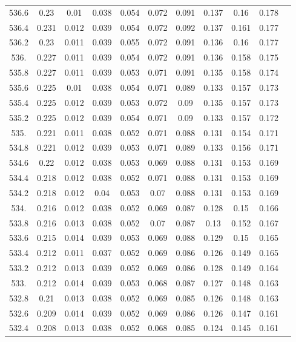 \documentclass[12pt]{ctexart}
\numberwithin{equation}{section}
\begin{document}
\begin{longtable}{ccccccccccc}
536.6	&	0.23	&	0.01	&	0.038	&	0.054	&	0.072	&	0.091	&	0.137	&	0.16	&	0.178	\\
536.4	&	0.231	&	0.012	&	0.039	&	0.054	&	0.072	&	0.092	&	0.137	&	0.161	&	0.177	\\
536.2	&	0.23	&	0.011	&	0.039	&	0.055	&	0.072	&	0.091	&	0.136	&	0.16	&	0.177	\\
536.	&	0.227	&	0.011	&	0.039	&	0.054	&	0.072	&	0.091	&	0.136	&	0.158	&	0.175	\\
535.8	&	0.227	&	0.011	&	0.039	&	0.053	&	0.071	&	0.091	&	0.135	&	0.158	&	0.174	\\
535.6	&	0.225	&	0.01	&	0.038	&	0.054	&	0.071	&	0.089	&	0.133	&	0.157	&	0.173	\\
535.4	&	0.225	&	0.012	&	0.039	&	0.053	&	0.072	&	0.09	&	0.135	&	0.157	&	0.173	\\
535.2	&	0.225	&	0.012	&	0.039	&	0.054	&	0.071	&	0.09	&	0.133	&	0.157	&	0.172	\\
535.	&	0.221	&	0.011	&	0.038	&	0.052	&	0.071	&	0.088	&	0.131	&	0.154	&	0.171	\\
534.8	&	0.221	&	0.012	&	0.039	&	0.053	&	0.071	&	0.089	&	0.133	&	0.156	&	0.171	\\
534.6	&	0.22	&	0.012	&	0.038	&	0.053	&	0.069	&	0.088	&	0.131	&	0.153	&	0.169	\\
534.4	&	0.218	&	0.012	&	0.038	&	0.052	&	0.071	&	0.088	&	0.131	&	0.153	&	0.169	\\
534.2	&	0.218	&	0.012	&	0.04	&	0.053	&	0.07	&	0.088	&	0.131	&	0.153	&	0.169	\\
534.	&	0.216	&	0.012	&	0.038	&	0.052	&	0.069	&	0.087	&	0.128	&	0.15	&	0.166	\\
533.8	&	0.216	&	0.013	&	0.038	&	0.052	&	0.07	&	0.087	&	0.13	&	0.152	&	0.167	\\
533.6	&	0.215	&	0.014	&	0.039	&	0.053	&	0.069	&	0.088	&	0.129	&	0.15	&	0.165	\\
533.4	&	0.212	&	0.011	&	0.037	&	0.052	&	0.069	&	0.086	&	0.126	&	0.149	&	0.165	\\
533.2	&	0.212	&	0.013	&	0.039	&	0.052	&	0.069	&	0.086	&	0.128	&	0.149	&	0.164	\\
533.	&	0.212	&	0.014	&	0.039	&	0.053	&	0.068	&	0.087	&	0.127	&	0.148	&	0.163	\\
532.8	&	0.21	&	0.013	&	0.038	&	0.052	&	0.069	&	0.085	&	0.126	&	0.148	&	0.163	\\
532.6	&	0.209	&	0.014	&	0.039	&	0.052	&	0.069	&	0.086	&	0.126	&	0.147	&	0.161	\\
532.4	&	0.208	&	0.013	&	0.038	&	0.052	&	0.068	&	0.085	&	0.124	&	0.145	&	0.161	\\

\end{longtable}
\end{document}
